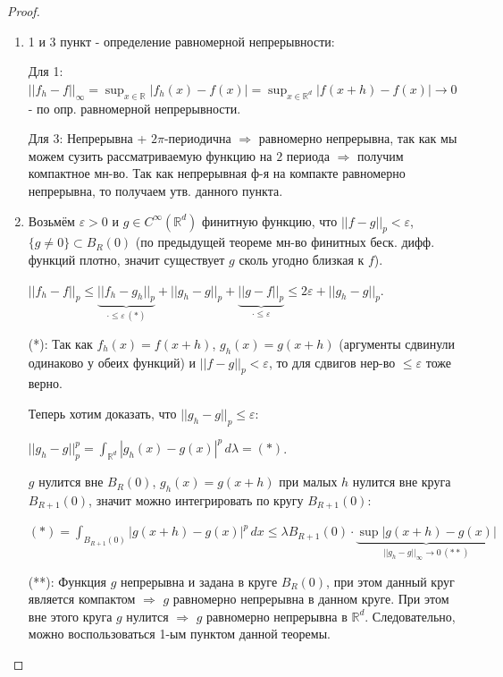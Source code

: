 \begin{proof}
    \begin{enumerate}
        \item {
            1 и 3 пункт - определение равномерной непрерывности:

            Для 1: $||f_h - f||_\infty = \sup_{x \in \mathbb{R}} |f_h(x) - f(x)| = \sup_{x \in \mathbb{R}^d} |f(x + h) - f(x)| \rightarrow 0$ - по опр. равномерной непрерывности.

            Для 3: Непрерывна + $2\pi$-периодична $\Rightarrow$ равномерно непрерывна, так как мы можем сузить рассматриваемую функцию на $2$ периода $\Rightarrow$ получим компактное мн-во. Так как непрерывная ф-я на компакте равномерно непрерывна, то получаем утв. данного пункта.
        }
        \item {
            Возьмём $\varepsilon > 0$ и $g \in C^{\infty}(\mathbb{R}^d)$ финитную функцию, что $||f - g||_p < \varepsilon$, $\{g \neq 0\} \subset B_{R}(0)$ (по предыдущей теореме мн-во финитных беск. дифф. функций плотно, значит существует $g$ сколь угодно близкая к $f$).

            $||f_h - f||_p \leqslant \underbrace{||f_h - g_h ||_p}_{\cdot \leq \varepsilon \, (*)} + ||g_h - g||_p + \underbrace{||g - f||_p}_{\cdot \leq \varepsilon} \leqslant 2\varepsilon + ||g_h - g||_p$.

            (*): Так как $f_h(x) = f(x + h)$, $g_h(x) = g(x + h)$ (аргументы сдвинули одинаково у обеих функций) и $|| f - g ||_p < \varepsilon$, то для сдвигов нер-во $\leq \varepsilon$ тоже верно.

            Теперь хотим доказать, что $||g_h - g||_p \leq \varepsilon$:

            $||g_h - g||_p^p = \int_{\mathbb{R}^d} |g_h(x) - g(x)|^p \, d\lambda = (*)$.

            $g$ нулится вне $B_R (0)$, $g_h(x) = g(x + h)$ при малых $h$ нулится вне круга $B_{R+1}(0)$, значит можно интегрировать по кругу $B_{R+1}(0)$:

            $(*) = \int_{B_{R + 1}(0)} |g(x + h) - g(x)|^p \, dx \leqslant \lambda B_{R + 1} (0) \cdot \underbrace{\sup |g(x + h) - g(x)|}_{||g_h - g||_{\infty} \rightarrow 0 \, (**)}$

            (**): Функция $g$ непрерывна и задана в круге $B_{R}(0)$, при этом данный круг является компактом $\Rightarrow$ $g$ равномерно непрерывна в данном круге. При этом вне этого круга $g$ нулится $\Rightarrow$ $g$ равномерно непрерывна в $\mathbb{R}^d$. Следовательно, можно воспользоваться 1-ым пунктом данной теоремы.
        }
    \end{enumerate}

\end{proof}

